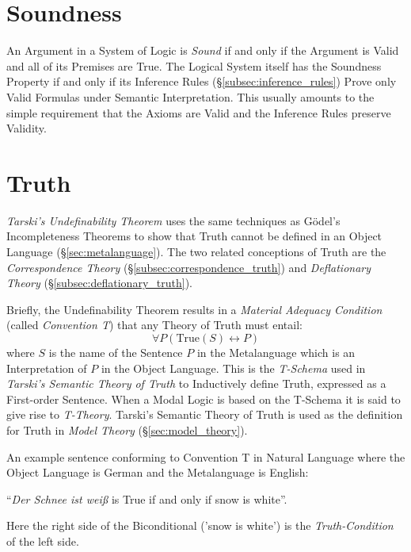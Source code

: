 \documentclass{article}
\begin{document}
\section{Soundness}\label{sec:soundness}

An Argument in a System of Logic is \emph{Sound} if and only if the
Argument is Valid and all of its Premises are True. The Logical System
itself has the Soundness Property if and only if its Inference Rules
(\S\ref{subsec:inference_rules}) Prove only Valid Formulas under
Semantic Interpretation. This usually amounts to the simple
requirement that the Axioms are Valid and the Inference Rules preserve
Validity.



\section{Truth}\label{sec:semantic_truth}

\emph{Tarski's Undefinability Theorem} \cite{tarski36} uses the same
techniques as G\"odel's Incompleteness Theorems to show that Truth
cannot be defined in an Object Language
(\S\ref{sec:metalanguage}). The two related conceptions of Truth are
the \emph{Correspondence Theory} (\S\ref{subsec:correspondence_truth})
and \emph{Deflationary Theory} (\S\ref{subsec:deflationary_truth}).

Briefly, the Undefinability Theorem results in a \emph{Material
  Adequacy Condition} (called \emph{Convention T}) that any Theory of
Truth must entail:
\[
    \forall P (\mathrm{True}(S) \leftrightarrow P)
\]
where $S$ is the name of the Sentence $P$ in the Metalanguage which is
an Interpretation of $P$ in the Object Language. This is the
\emph{T-Schema} used in \emph{Tarski's Semantic Theory of Truth} to
Inductively define Truth, expressed as a First-order Sentence. When a
Modal Logic is based on the T-Schema it is said to give rise to
\emph{T-Theory}. Tarski's Semantic Theory of Truth is used as the
definition for Truth in \emph{Model Theory}
(\S\ref{sec:model_theory}).

An example sentence conforming to Convention T in Natural Language
where the Object Language is German and the Metalanguage is English:
\begin{description}
\item ``\emph{Der Schnee ist wei\ss} is True if and only if snow is
  white''.
\end{description}
Here the right side of the Biconditional ('snow is white') is the
\emph{Truth-Condition} of the left side.
\end{document}
